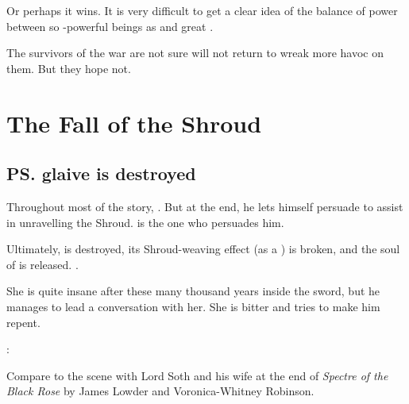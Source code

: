 Or perhaps it wins. 
It is very difficult to get a clear idea of the balance of power between so \uber-powerful beings as \xss{} and great \banelords. 

The survivors of the war are not sure \HothNrul{} will not return to wreak more havoc on them. 
But they hope not. 















\section{The Fall of the Shroud}
\subsection{\ps{\Ishnaruchaefir} glaive is destroyed}
Throughout most of the story, . But at the end, he lets himself persuade to assist in unravelling the Shroud. \Triestessakhin{} is the one who persuades him. 

Ultimately,  is destroyed, its Shroud-weaving effect (as a ) is broken, and the soul of \Triestessakhin{} is released. 
. 

She is quite insane after these many thousand years inside the sword, but he manages to lead a conversation with her. She is bitter and tries to make him repent. 

\Ishna: 

Compare to the scene with Lord Soth and his wife at the end of \emph{Spectre of the Black Rose} by James Lowder and Voronica-Whitney Robinson. 



% 







